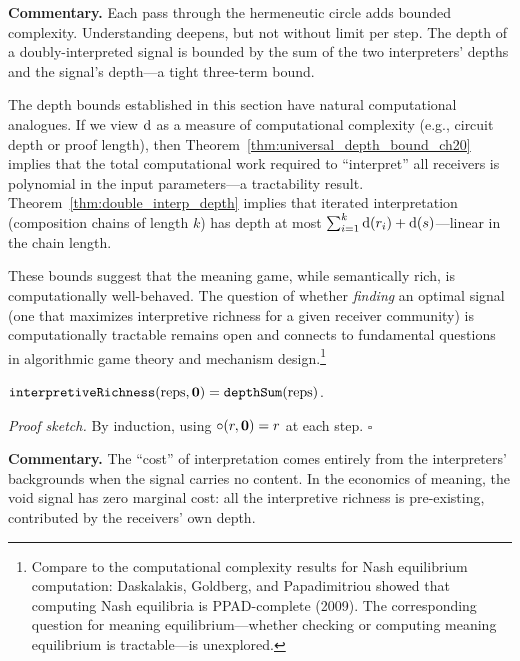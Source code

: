 \noindent\textbf{Commentary.}
Each pass through the hermeneutic circle adds bounded complexity.
Understanding deepens, but not without limit per step.  The depth of a
doubly-interpreted signal is bounded by the sum of the two interpreters'
depths and the signal's depth---a tight three-term bound.

\begin{remark}
\label{rem:computational_complexity}
The depth bounds established in this section have natural computational
analogues.  If we view $\operatorname{d}$ as a measure of computational complexity
(e.g., circuit depth or proof length), then
Theorem~\ref{thm:universal_depth_bound_ch20} implies that the total
computational work required to ``interpret'' all receivers is
polynomial in the input parameters---a tractability result.
Theorem~\ref{thm:double_interp_depth} implies that iterated interpretation
(composition chains of length $k$) has depth at most
$\sum_{i=1}^{k} \operatorname{d}(r_i) + \operatorname{d}(s)$---linear in the chain length.

These bounds suggest that the meaning game, while semantically rich, is
computationally well-behaved.  The question of whether \emph{finding} an
optimal signal (one that maximizes interpretive richness for a given
receiver community) is computationally tractable remains open and connects
to fundamental questions in algorithmic game theory and mechanism
design.\footnote{Compare to the computational complexity results for Nash
equilibrium computation: Daskalakis, Goldberg, and Papadimitriou showed
that computing Nash equilibria is PPAD-complete (2009).  The corresponding
question for meaning equilibrium---whether checking or computing meaning
equilibrium is tractable---is unexplored.}
\end{remark}

\begin{theorem}
\label{thm:void_signal_richness}
$\texttt{interpretiveRichness}(\text{reps}, \mathbf{0}) = \texttt{depthSum}(\text{reps})$.
\end{theorem}

\noindent\textit{Proof sketch.}\quad
By induction, using $\circ(r, \mathbf{0}) = r$ at each step.
\hfill$\square$

\medskip

\noindent\textbf{Commentary.}
The ``cost'' of interpretation comes entirely from the interpreters'
backgrounds when the signal carries no content.  In the economics of
meaning, the void signal has zero marginal cost: all the interpretive
richness is pre-existing, contributed by the receivers' own depth.

